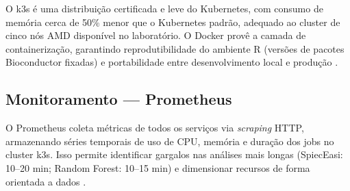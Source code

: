 O k3s é uma distribuição certificada e leve do Kubernetes, com
consumo de memória cerca de 50\% menor que o Kubernetes padrão,
adequado ao cluster de cinco nós AMD disponível no laboratório. O
Docker provê a camada de containerização, garantindo reprodutibilidade
do ambiente R (versões de pacotes Bioconductor fixadas) e portabilidade
entre desenvolvimento local e produção \cite{kubernetes2022}.

\subsection{Monitoramento — Prometheus}

O Prometheus coleta métricas de todos os serviços via
\textit{scraping} HTTP, armazenando séries temporais de uso de CPU,
memória e duração dos jobs no cluster k3s. Isso permite identificar
gargalos nas análises mais longas (SpiecEasi: 10--20 min; Random
Forest: 10--15 min) e dimensionar recursos de forma orientada a dados
\cite{prometheus2023docs}.
